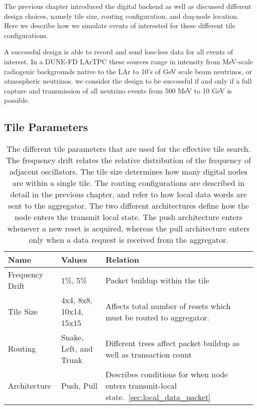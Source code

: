 The previous chapter introduced the digital backend as well as discussed different design choices, namely tile size, routing configuration, and daq-node location.
Here we describe how we simulate events of interested for these different tile configurations.

A successful design is able to record and send loss-less data for all events of interest.
In a DUNE-FD LArTPC these sources range in intensity from MeV-scale radiogenic backgrounds native to the LAr to 10's of GeV scale beam neutrinos, or atmospheric neutrinos.
we consider the design to be successful if and only if a full capture and transmission of all neutrino events from 500 MeV to 10 GeV is possible.

\subsection{Tile Parameters}

\begin{table}
\begin{center}
\begin{tabular}{|| p{30mm} | p{30mm} | p{90mm} ||}
 \hline
 Name & Values & Relation \\ [0.5ex]
 \hline\hline
  Frequency Drift & 1\%, 5\% & Packet buildup within the tile \\
 \hline
  Tile Size & 4x4, 8x8, 10x14, 15x15 & Affects total number of resets which must be routed to aggregator.\\
 \hline
  Routing & Snake, Left, and Trunk & Different trees affect packet buildup as well as transaction count  \\
 \hline
  Architecture & Push, Pull & Describes conditions for when node enters transmit-local state.~\ref{sec:local_data_packet}  \\
 \hline
\end{tabular}
\caption{The different tile parameters that are used for the effective tile search.
  The frequency drift relates the relative distribution of the frequency of adjacent oscillators.
  The tile size determines how many digital nodes are within a single tile.
  The routing configurations are described in detail in the previous chapter, and refer to how local data words are sent to the aggregator.
  The two different architectures define how the node enters the transmit local state.
  The push architecture enters whenever a new reset is acquired, whereas the pull architecture enters only when a data request is received from the aggregator.}
\end{center}
\end{table}
~\label{table:tile_params}

